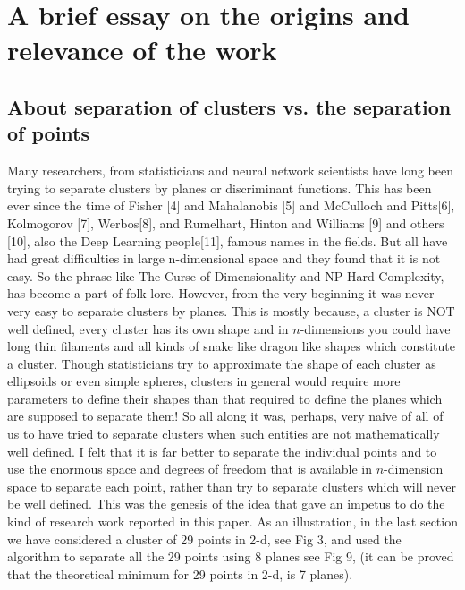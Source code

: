\documentclass[english]{article}
\begin{document}
\medskip{}



\section*{A brief essay on the origins and relevance of the work}

\medskip{}



\subsection*{About separation of clusters vs. the separation of points }

Many researchers, from statisticians and neural network scientists
have long been trying to separate clusters by planes or discriminant
functions. This has been ever since the time of Fisher {[}4{]} and
Mahalanobis {[}5{]} and McCulloch and Pitts{[}6{]}, Kolmogorov {[}7{]},
Werbos{[}8{]}, and Rumelhart, Hinton and Williams {[}9{]} and others
{[}10{]}, also the Deep Learning people{[}11{]}, famous names in the
fields. But all have had great difficulties in large n-dimensional
space and they found that it is not easy. So the phrase like \textquotedbl{}The
Curse of Dimensionality\textquotedbl{} and \textquotedbl{}NP Hard
Complexity\textquotedbl{}, has become a part of folk lore. However,
from the very beginning it was never very easy to separate clusters
by planes. This is mostly because, a cluster is NOT well defined,
every cluster has its own shape and in $n$-dimensions you could have
long thin filaments and all kinds of snake like dragon like shapes
which constitute a cluster. Though statisticians try to approximate
the shape of each cluster as ellipsoids or even simple spheres, clusters
in general would require more parameters to define their shapes than
that required to define the planes which are supposed to separate
them! So all along it was, perhaps, very naive of all of us to have
tried to separate clusters when such entities are not mathematically
well defined. I felt that it is far better to separate the individual
points and to use the enormous space and degrees of freedom that is
available in $n$-dimension space to separate each point, rather than
try to separate clusters which will never be well defined. This was
the genesis of the idea that gave an impetus to do the kind of research
work reported in this paper. As an illustration, in the last section
we have considered a cluster of 29 points in 2-d, see Fig 3, 
and used the algorithm to separate all the 29 points using 8 planes
see Fig 9, (it can be proved that the theoretical minimum for
29 points in 2-d, is 7 planes).
\end{document}
